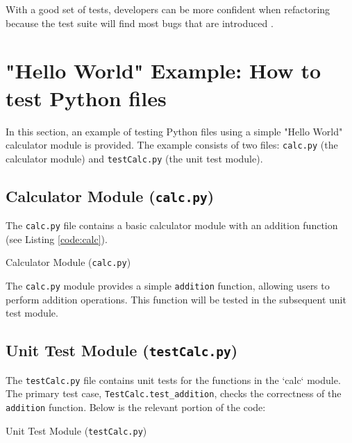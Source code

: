 With a good set of tests, developers can be more confident when refactoring because the test suite will find most bugs that are introduced \cite{Ousterhout:2018}. 


\section{"Hello World" Example: How to test Python files}

In this section, an example of testing Python files using a simple "Hello World" calculator module is provided. The example consists of two files: \texttt{calc.py} (the calculator module) and \texttt{testCalc.py} (the unit test module).

\subsection{Calculator Module (\texttt{calc.py})}

The \texttt{calc.py} file contains a basic calculator module with an addition function (see Listing \ref{code:calc}).

\begin{code}[h!]
	    
	
	\caption{Calculator Module (\texttt{calc.py})}
	\label{code:calc}
\end{code}

The \texttt{calc.py} module provides a simple \texttt{addition} function, allowing users to perform addition operations. This function will be tested in the subsequent unit test module.

\subsection{Unit Test Module (\texttt{testCalc.py})}

The \texttt{testCalc.py} file contains unit tests for the functions in the `calc` module. The primary test case, \texttt{TestCalc.test\_addition}, checks the correctness of the \texttt{addition} function. Below is the relevant portion of the code:

\begin{code}[h!]
	    
	
	\caption{Unit Test Module (\texttt{testCalc.py})}
	\label{code:testCalc}
\end{code}

